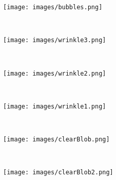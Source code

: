 \documentclass[review,12pt,3p]{elsarticle}
\begin{document}
\begin{figure}
        \centering
        \begin{subfigure}[b]{0.08\textwidth}
                \texttt{[image: images/bubbles.png]}
                \caption{}
                \label{fig:gull}
        \end{subfigure}%
        ~ %
        \begin{subfigure}[b]{0.08\textwidth}
                \texttt{[image: images/wrinkle3.png]}
                \caption{}
        \end{subfigure}
        ~
        \begin{subfigure}[b]{0.08\textwidth}
                \texttt{[image: images/wrinkle2.png]}
                \caption{}
        \end{subfigure}
        ~
        \begin{subfigure}[b]{0.08\textwidth}
                \texttt{[image: images/wrinkle1.png]}
                \caption{}
        \end{subfigure}
        ~
        \begin{subfigure}[b]{0.08\textwidth}
                \texttt{[image: images/clearBlob.png]}
                \caption{}
        \end{subfigure}
        ~
        \begin{subfigure}[b]{0.08\textwidth}
                \texttt{[image: images/clearBlob2.png]}
                \caption{}
        \end{subfigure}


\end{figure}
\end{document}
